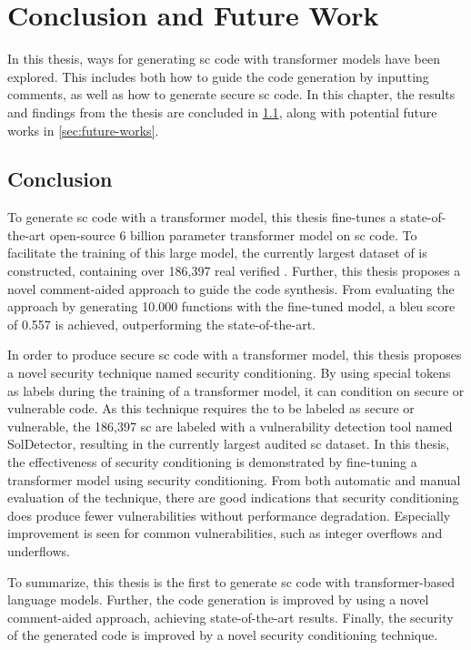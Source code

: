 \chapter{Conclusion and Future Work}
\label{chap:conclusion}
In this thesis, ways for generating \acrfull{sc} code with transformer models have been explored. This includes both how to guide the code generation by inputting comments, as well as how to generate secure \acrshort{sc} code. In this chapter, the results and findings from the thesis are concluded in \cref{sec:conclusion}, along with potential future works in \cref{sec:future-works}.

\section{Conclusion}
\label{sec:conclusion}
To generate \acrfull{sc} code with a transformer model, this thesis fine-tunes a state-of-the-art open-source 6 billion parameter transformer model on \acrshort{sc} code. To facilitate the training of this large model, the currently largest dataset of  is constructed, containing over 186,397 real verified . Further, this thesis proposes a novel comment-aided approach to guide the code synthesis. From evaluating the approach by generating 10.000 functions with the fine-tuned model, a \acrshort{bleu} score of 0.557 is achieved, outperforming the state-of-the-art.

In order to produce secure \acrshort{sc} code with a transformer model, this thesis proposes a novel security technique named security conditioning. By using special tokens as labels during the training of a transformer model, it can condition on secure or vulnerable code. As this technique requires the  to be labeled as secure or vulnerable, the 186,397 \acrshort{sc} are labeled with a vulnerability detection tool named SolDetector, resulting in the currently largest audited \acrshort{sc} dataset. In this thesis, the effectiveness of security conditioning is demonstrated by fine-tuning a transformer model using security conditioning. From both automatic and manual evaluation of the technique, there are good indications that security conditioning does produce fewer vulnerabilities without performance degradation. Especially improvement is seen for common vulnerabilities, such as integer overflows and underflows.

To summarize, this thesis is the first to generate \acrshort{sc} code with transformer-based language models. Further, the code generation is improved by using a novel comment-aided approach, achieving state-of-the-art results. Finally, the security of the generated code is improved by a novel security conditioning technique.

